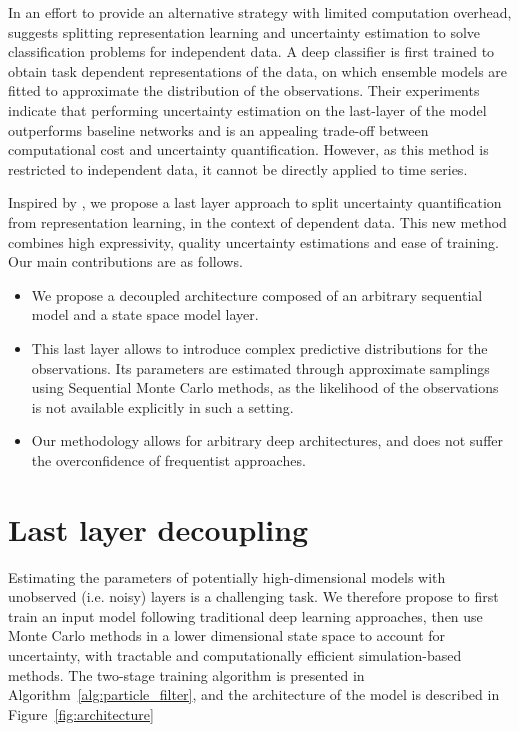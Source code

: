 \documentclass[conference]{IEEEtran}
\begin{document}
In an effort to provide an alternative strategy with limited computation overhead, \cite{Brosse2020OnLA} suggests splitting representation learning and uncertainty estimation to solve classification problems for independent data.
A deep classifier is first trained to obtain task dependent representations of the data, on which ensemble models are fitted to approximate the distribution of the observations.
Their experiments indicate that performing uncertainty estimation on the last-layer of the model outperforms baseline networks and is an appealing trade-off between computational cost and uncertainty quantification.
However, as this method is restricted to independent data, it cannot be directly applied to time series.

Inspired by \cite{Brosse2020OnLA}, we propose a last layer approach to split uncertainty quantification from representation learning, in the context of dependent data.
This new method combines high expressivity, quality uncertainty estimations and ease of training.
Our main contributions are as follows.
\begin{itemize}
	\item We propose a decoupled architecture composed of an arbitrary sequential model and a state space model layer.
	\item This last layer allows to introduce complex predictive distributions for the observations.
	      Its parameters are estimated through approximate samplings using Sequential Monte Carlo methods, as the likelihood of the observations is not available explicitly in such a setting.
	\item Our methodology allows for arbitrary deep architectures, and does not suffer the overconfidence of frequentist approaches.
\end{itemize}

\section{Last layer decoupling}
Estimating the parameters of potentially high-dimensional models with unobserved (i.e. noisy) layers is a challenging task.
We therefore propose to first train an input model following traditional deep learning approaches, then use Monte Carlo methods in a lower dimensional state space to account for uncertainty, with tractable and computationally efficient simulation-based methods.
The two-stage training algorithm is presented in Algorithm~\ref{alg:particle_filter}, and the architecture of the model is described in Figure~\ref{fig:architecture}
\end{document}
